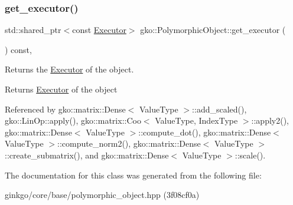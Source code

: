 \subsubsection{\texorpdfstring{get\+\_\+executor()}{get\_executor()}}
{\footnotesize\ttfamily std\+::shared\+\_\+ptr$<$const \hyperlink{classgko_1_1Executor}{Executor}$>$ gko\+::\+Polymorphic\+Object\+::get\+\_\+executor (\begin{DoxyParamCaption}{ }\end{DoxyParamCaption}) const\hspace{0.3cm}{\ttfamily [inline]}, {\ttfamily [noexcept]}}



Returns the \hyperlink{classgko_1_1Executor}{Executor} of the object. 

\begin{DoxyReturn}{Returns}
\hyperlink{classgko_1_1Executor}{Executor} of the object 
\end{DoxyReturn}


Referenced by gko\+::matrix\+::\+Dense$<$ Value\+Type $>$\+::add\+\_\+scaled(), gko\+::\+Lin\+Op\+::apply(), gko\+::matrix\+::\+Coo$<$ Value\+Type, Index\+Type $>$\+::apply2(), gko\+::matrix\+::\+Dense$<$ Value\+Type $>$\+::compute\+\_\+dot(), gko\+::matrix\+::\+Dense$<$ Value\+Type $>$\+::compute\+\_\+norm2(), gko\+::matrix\+::\+Dense$<$ Value\+Type $>$\+::create\+\_\+submatrix(), and gko\+::matrix\+::\+Dense$<$ Value\+Type $>$\+::scale().



The documentation for this class was generated from the following file\+:\begin{DoxyCompactItemize}
\item 
ginkgo/core/base/polymorphic\+\_\+object.\+hpp (3f08cf0a)\end{DoxyCompactItemize}

